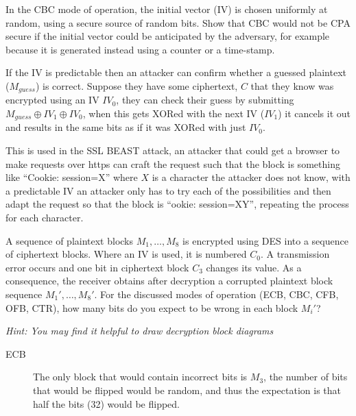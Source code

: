 \documentclass{supervision}
\begin{document}
  \begin{questions}
    \question In the CBC mode of operation, the initial vector (IV) is chosen
      uniformly at random, using a secure source of random bits. Show that CBC
      would not be CPA secure if the initial vector could be anticipated by the
      adversary, for example because it is generated instead using a counter or
      a time-stamp.

      \begin{solution}
        If the IV is predictable then an attacker can confirm whether a guessed
        plaintext ($M_{guess}$) is correct. Suppose they have some ciphertext,
        $C$ that they know was encrypted using an IV $IV_0$, they can check
        their guess by submitting $M_{guess} \oplus IV_1 \oplus IV_0$, when
        this gets XORed with the next IV ($IV_1$) it cancels it out and results
        in the same bits as if it was XORed with just $IV_0$.

        This is used in the SSL BEAST attack, an attacker that could get a
        browser to make requests over https can craft the request such that the
        block is something like ``Cookie: session=X'' where $X$ is a character
        the attacker does not know, with a predictable IV an attacker only has
        to try each of the possibilities and then adapt the request so that the
        block is ``ookie: session=XY'', repeating the process for each
        character.
      \end{solution}

    \question A sequence of plaintext blocks $M_1, \ldots , M_8$ is encrypted
      using DES into a sequence of ciphertext blocks. Where an IV is used, it
      is numbered $C_0$. A transmission error occurs and one bit in ciphertext
      block $C_3$ changes its value. As a consequence, the receiver obtains
      after decryption a corrupted plaintext block sequence $M_1', \ldots ,
      M_8'$. For the discussed modes of operation (ECB, CBC, CFB, OFB, CTR),
      how many bits do you expect to be wrong in each block $M_i'$?

      \textit{Hint: You may find it helpful to draw decryption block diagrams}

      \begin{solution}
        \begin{description}
          \item[ECB] The only block that would contain incorrect bits is $M_3$,
            the number of bits that would be flipped would be random, and thus
            the expectation is that half the bits (32) would be flipped.


\end{description}
\end{solution}
\end{questions}
\end{document}
